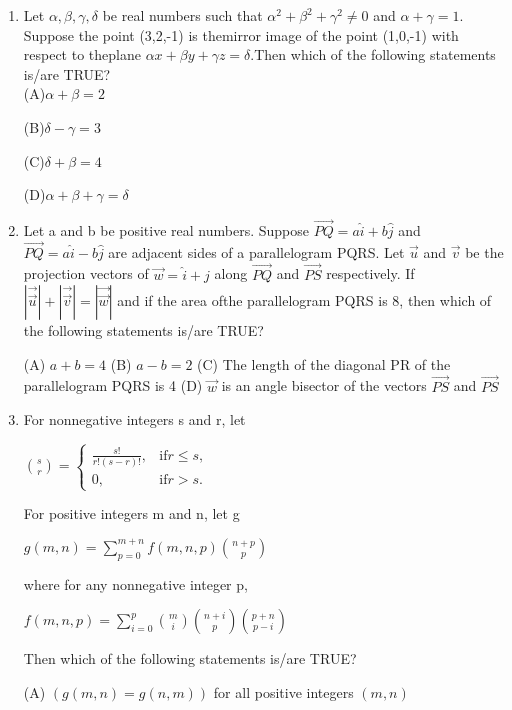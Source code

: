 \documentclass{article}
\begin{document}
\begin{enumerate}
\item Let $\alpha,\beta,\gamma,\delta$ be real numbers such that $\alpha^2 + \beta^2 + \gamma^2 \neq 0$ and $\alpha + \gamma = 1$. Suppose the point (3,2,-1) is themirror image of the point (1,0,-1) with respect to theplane ${\alpha}x + {\beta}y + {\gamma}z = \delta$.Then which of the following statements is/are TRUE?\\

(A)$\alpha + \beta = 2$ 
 
(B)$\delta - \gamma = 3$

(C)$\delta + \beta = 4 $ 

(D)$\alpha + \beta + \gamma = \delta$

\item Let a and b be positive real numbers. Suppose $\overrightarrow {PQ} = a\hat{i} + b\hat{j}$ and $\overrightarrow{PQ} = a\hat{i} - b\hat{j}$ are adjacent sides 
of a parallelogram PQRS. Let $\overrightarrow{u}$ and $\overrightarrow{v}$ be the projection vectors of $\overrightarrow{w} = \hat{i} + \hat{j}$ along $\overrightarrow{PQ}$ and $\overrightarrow{PS}$ respectively. If $|\vec{\overrightarrow{u}}| + |\vec{\overrightarrow{v}}| = |\vec{\overrightarrow{w}}|$ and if the area ofthe parallelogram PQRS is 8, then which of the following statements is/are TRUE?

(A) $a + b = 4$
(B) $a - b = 2$
(C) The length of the diagonal PR of the parallelogram PQRS is 4
(D) $\overrightarrow{w}$ is an angle bisector of the vectors $\overrightarrow{PS}$ and $\overrightarrow{PS}$

\item For nonnegative integers s and r, let 
          
$\binom{s}{r} =
\begin{cases}
\frac{s!}{r!(s - r)!},&\text{if} r \leq s,\\ 0, & \text{if} r > s.
\end{cases}$

For positive integers m and n, let g
          
	  $g(m, n) = \sum_{p=0}^{m+n} f(m, n, p) \binom{n + p}{p}$
	  
where for any nonnegative integer p,

       $ f(m, n, p) = \sum_{i=0}^{p} \binom{m}{i} \binom{n + i}{p} \binom{p + n}{p - i}$

       
Then which of the following statements is/are TRUE?

(A) $( g(m, n) = g(n, m) )$ for all positive integers $( m, n )$


\end{enumerate}
\end{document}

